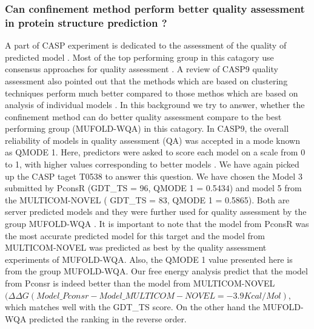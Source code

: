 \documentclass[12pt]{article}
\begin{document}
\subsubsection{Can confinement method perform better quality assessment in protein structure prediction ?}
A part of CASP experiment is dedicated to the assessment of the quality of predicted model \cite{Kryshtafovych2011}. 
Most of the top performing group in this catagory use consensus approaches for quality assessment \cite{Wang2011}.
A review of CASP9 quality assessment also pointed out that the methods which are based on clustering
techniques perform
much better compared to those methos which are based on analysis of individual models \cite{Kryshtafovych2011}. 
In this background we try to answer, whether the confinement method can do better quality assessment compare to the best performing
group (MUFOLD-WQA) in this catagory. In CASP9, the overall reliability of models in quality assessment (QA) was accepted in a mode known as
QMODE 1. Here, predictors were asked to score each model on a scale from 0 to 1, with higher values corresponding to better models \cite{Kryshtafovych2011}. 
We have again picked up the CASP taget T0538 to answer this question. We have chosen the Model 3 submitted by PconsR (GDT\_TS = 96, QMODE 1 = 0.5434) 
and model 5 from the MULTICOM-NOVEL ( GDT\_TS = 83, QMODE 1 = 0.5865). Both are server predicted models and they were further used for quality assessment 
by the group MUFOLD-WQA \cite{Wang2011}. It is important to note that the model from PconsR was the most accurate predicted model for this 
target and the model from MULTICOM-NOVEL was predicted as best by the quality assessment experiments of MUFOLD-WQA. Also, 
the QMODE 1 value presented here is from the group MUFOLD-WQA. 
Our free energy analysis predict that the model from Pconsr is indeed better than the model from 
MULTICOM-NOVEL $(\Delta \Delta G (Model\_Pconsr - Model\_MULTICOM-NOVEL = -3.9 Kcal/Mol)$, which   
matches well with the GDT\_TS score. On the other hand the MUFOLD-WQA predicted the ranking in the reverse order. 
\end{document}
